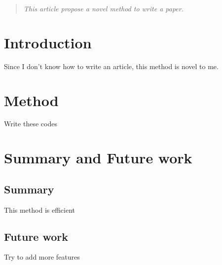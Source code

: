 \documentclass[10pt]{article}
\begin{document}
\begin{abstract}
\textit{This article propose a novel method to write a paper.}
\end{abstract}

\section{Introduction}
Since I don't know how to write an article, this method is novel to me.\cite{DBLP:journals/corr/RajpurkarMKCTWN15}

\section{Method}
Write these codes

\section{Summary and Future work}
\subsection{Summary}
This method is efficient
\subsection{Future work}
Try to add more features


\nocite{*}


\end{document}
